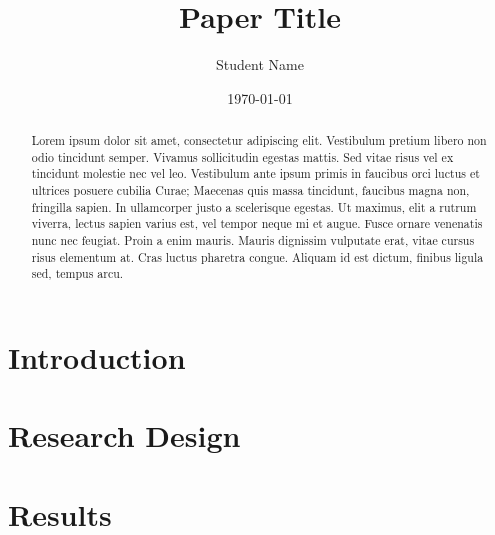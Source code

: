 \documentclass{article}
\title{Paper Title}
\author{Student Name}
\date{\today}
\begin{document}
\maketitle

\begin{abstract}
Lorem ipsum dolor sit amet, consectetur adipiscing elit. Vestibulum pretium libero non odio tincidunt semper. Vivamus sollicitudin egestas mattis. Sed vitae risus vel ex tincidunt molestie nec vel leo. Vestibulum ante ipsum primis in faucibus orci luctus et ultrices posuere cubilia Curae; Maecenas quis massa tincidunt, faucibus magna non, fringilla sapien. In ullamcorper justo a scelerisque egestas. Ut maximus, elit a rutrum viverra, lectus sapien varius est, vel tempor neque mi et augue. Fusce ornare venenatis nunc nec feugiat. Proin a enim mauris. Mauris dignissim vulputate erat, vitae cursus risus elementum at. Cras luctus pharetra congue. Aliquam id est dictum, finibus ligula sed, tempus arcu. 
\end{abstract} \hspace{10pt}

\section{Introduction}


\section{Research Design}


\section{Results}

\end{document}

